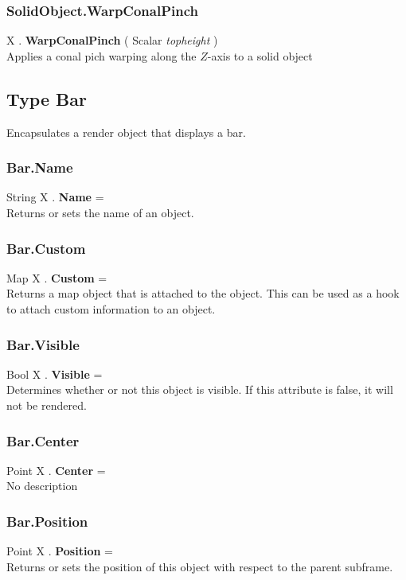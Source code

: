 \subsubsection{SolidObject.WarpConalPinch \label{F:SolidObject:WarpConalPinch}}
X . \textbf{WarpConalPinch} ( Scalar \textit{topheight} ) \\
Applies a conal pich warping along the $Z$-axis to a solid object

\subsection{Type Bar \label{T:Bar}}
Encapsulates a render object that displays a bar.

\subsubsection{Bar.Name \label{F:Bar:Name}}
String X . \textbf{Name} = \\
Returns or sets the name of an object.

\subsubsection{Bar.Custom \label{F:Bar:Custom}}
Map X . \textbf{Custom} = \\
Returns a map object that is attached to the object. This can be used as a hook to attach custom information to an object.


\subsubsection{Bar.Visible \label{F:Bar:Visible}}
Bool X . \textbf{Visible} = \\
Determines whether or not this object is visible. If this attribute is false, it will not be rendered.

\subsubsection{Bar.Center \label{F:Bar:Center}}
Point X . \textbf{Center} = \\
No description

\subsubsection{Bar.Position \label{F:Bar:Position}}
Point X . \textbf{Position} = \\
Returns or sets the position of this object with respect to the parent subframe.

